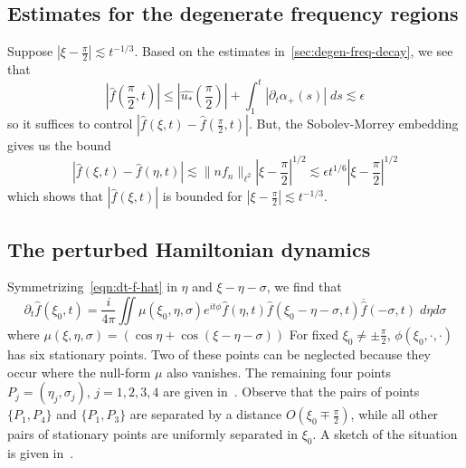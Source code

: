 \documentclass[letterpaper, reqno,final]{amsart}
\newcommand{\fhPi}{\frac{\pi}{2}}
\newcommand{\bigO}[1]{O\left({#1}\right)}
\begin{document}
\subsection{Estimates for the degenerate frequency regions}
Suppose $\left|\xi-\fhPi\right| \lesssim t^{-1/3}$.  Based on the estimates in~\eqref{sec:degen-freq-decay}, we see that
\begin{equation*}
    |\hat{f}(\fhPi, t)| \leq |\hat{u_*}(\fhPi)| + \int_1^t |\partial_t \alpha_+(s)|\;ds \lesssim \epsilon
\end{equation*}
so it suffices to control $|\hat{f}(\xi,t) - \hat{f}(\fhPi,t)|$.  But, the Sobolev-Morrey embedding gives us the bound
\begin{equation*}
    |\hat{f}(\xi,t) - \hat{f}(\eta,t)| \lesssim \lVert nf_n \rVert_{\ell^2} |\xi - \fhPi|^{1/2} \lesssim \epsilon t^{1/6} |\xi - \fhPi|^{1/2}
\end{equation*}
which shows that $|\hat{f}(\xi,t)|$ is bounded for $|\xi - \fhPi| \lesssim t^{-1/3}$.

\subsection{The perturbed Hamiltonian dynamics}

  Symmetrizing~\eqref{eqn:dt-f-hat} in $\eta$ and $\xi - \eta - \sigma$, we find that
\begin{equation}\label{eqn:f-hat-symmetrized-eqn}
	\partial_t \hat{f}(\xi_0,t) = \frac{i}{4\pi} \iint \mu(\xi_0,\eta,\sigma) e^{it\phi} \hat{f}(\eta,t) \hat{f}(\xi_0 - \eta - \sigma, t) \overline{\hat{f}}(-\sigma, t)\;d\eta d\sigma
\end{equation}
where $\mu(\xi, \eta, \sigma) = \left(\cos \eta + \cos(\xi - \eta - \sigma)\right)$
For fixed $\xi_0 \neq \pm \frac{\pi}{2}$, $\phi(\xi_0, \cdot, \cdot)$ has six stationary points.  Two of these points can be neglected because they occur where the null-form $\mu$ also vanishes.  The remaining four points $P_j = (\eta_j, \sigma_j)$, $j=1,2,3,4$ are given in~.  Observe that the pairs of points $\{P_1,P_4\}$ and $\{P_1,P_3\}$ are separated by a distance $\bigO{\xi_0 \mp \fhPi}$, while all other pairs of stationary points are uniformly separated in $\xi_0$.  A sketch of the situation is given in~.
\end{document}
